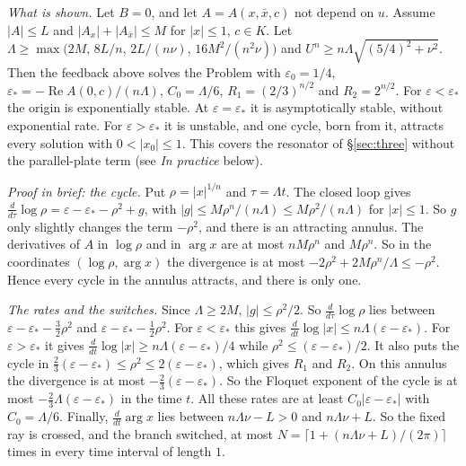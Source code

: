 \documentclass[11pt,reqno]{amsart}
\theoremstyle{plain}
\theoremstyle{definition}
\theoremstyle{remark}
\begin{document}
\begin{enumerate}
\emph{What is shown.} Let $B=0$, and let $A=A(x,\bar x,c)$ not depend on $u$. Assume $|A|\le L$ and $|A_x|+|A_{\bar x}|\le M$ for $|x|\le1$, $c\in K$. Let $\Lambda\ge\max\bigl(2M,\,8L/n,\,2L/(n\nu),\,16M^{2}/(n^{2}\nu)\bigr)$ and $U^{n}\ge n\Lambda\sqrt{(5/4)^{2}+\nu^{2}}$. Then the feedback above solves the Problem with $\varepsilon_0=1/4$, $\varepsilon_*=-\operatorname{Re}A(0,c)/(n\Lambda)$, $C_0=\Lambda/6$, $R_1=(2/3)^{n/2}$ and $R_2=2^{n/2}$. For $\varepsilon<\varepsilon_*$ the origin is exponentially stable. At $\varepsilon=\varepsilon_*$ it is asymptotically stable, without exponential rate. For $\varepsilon>\varepsilon_*$ it is unstable, and one cycle, born from it, attracts every solution with $0<|x_0|\le1$. This covers the resonator of \S\ref{sec:three} without the parallel-plate term (see \emph{In practice} below).

\emph{Proof in brief: the cycle.} Put $\rho=|x|^{1/n}$ and $\tau=\Lambda t$. The closed loop gives $\frac{d}{d\tau}\log\rho=\varepsilon-\varepsilon_*-\rho^{2}+g$, with $|g|\le M\rho^{n}/(n\Lambda)\le M\rho^{2}/(n\Lambda)$ for $|x|\le1$. So $g$ only slightly changes the term $-\rho^{2}$, and there is an attracting annulus. The derivatives of $A$ in $\log\rho$ and in $\arg x$ are at most $nM\rho^{n}$ and $M\rho^{n}$. So in the coordinates $(\log\rho,\arg x)$ the divergence is at most $-2\rho^{2}+2M\rho^{n}/\Lambda\le-\rho^{2}$. Hence every cycle in the annulus attracts, and there is only one.

\emph{The rates and the switches.} Since $\Lambda\ge2M$, $|g|\le\rho^{2}/2$. So $\frac{d}{d\tau}\log\rho$ lies between $\varepsilon-\varepsilon_*-\frac32\rho^{2}$ and $\varepsilon-\varepsilon_*-\frac12\rho^{2}$. For $\varepsilon<\varepsilon_*$ this gives $\frac{d}{dt}\log|x|\le n\Lambda(\varepsilon-\varepsilon_*)$. For $\varepsilon>\varepsilon_*$ it gives $\frac{d}{dt}\log|x|\ge n\Lambda(\varepsilon-\varepsilon_*)/4$ while $\rho^{2}\le(\varepsilon-\varepsilon_*)/2$. It also puts the cycle in $\frac23(\varepsilon-\varepsilon_*)\le\rho^{2}\le2(\varepsilon-\varepsilon_*)$, which gives $R_1$ and $R_2$. On this annulus the divergence is at most $-\frac23(\varepsilon-\varepsilon_*)$. So the Floquet exponent of the cycle is at most $-\frac23\Lambda(\varepsilon-\varepsilon_*)$ in the time $t$. All these rates are at least $C_0|\varepsilon-\varepsilon_*|$ with $C_0=\Lambda/6$. Finally, $\frac{d}{dt}\arg x$ lies between $n\Lambda\nu-L>0$ and $n\Lambda\nu+L$. So the fixed ray is crossed, and the branch switched, at most $N=\lceil1+(n\Lambda\nu+L)/(2\pi)\rceil$ times in every time interval of length $1$.


\end{enumerate}
\end{document}
